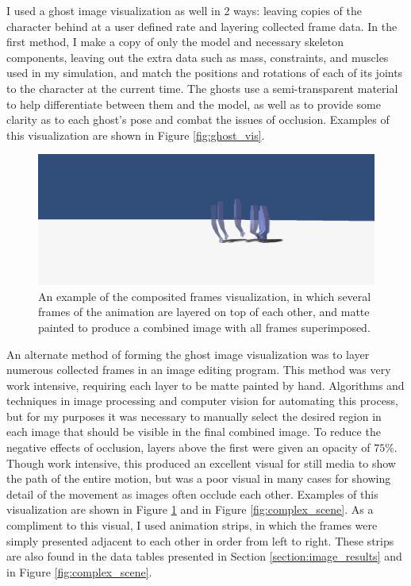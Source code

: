 I used a ghost image visualization as well in 2 ways: leaving copies of the character behind at a user defined rate and layering collected frame data.  In the first method, I make a copy of only the model and necessary skeleton components, leaving out the extra data such as mass, constraints, and muscles used in my simulation, and match the positions and rotations of each of its joints to the character at the current time.  The ghosts use a semi-transparent material to help differentiate between them and the model, as well as to provide some clarity as to each ghost's pose and combat the issues of occlusion.  Examples of this visualization are shown in Figure \ref{fig:ghost_vis}.

\begin{figure}[ht]
	\centering
	\includegraphics[width=\textwidth]{images/k200kvaryingcomposite.png}
	\caption[Composite frame visualization]{An example of the composited frames visualization, in which several frames of the animation are layered on top of each other, and matte painted to produce a combined image with all frames superimposed.}
	\label{fig:composite_vis}
\end{figure}

An alternate method of forming the ghost image visualization was to layer numerous collected frames in an image editing program.  This method was very work intensive, requiring each layer to be matte painted by hand.  Algorithms and techniques in image processing and computer vision for automating this process, but for my purposes it was necessary to manually select the desired region in each image that should be visible in the final combined image.  To reduce the negative effects of occlusion, layers above the first were given an opacity of $75\%$.  Though work intensive, this produced an excellent visual for still media to show the path of the entire motion, but was a poor visual in many cases for showing detail of the movement as images often occlude each other.  Examples of this visualization are shown in Figure \ref{fig:composite_vis} and in Figure \ref{fig:complex_scene}.  As a compliment to this visual, I used animation strips, in which the frames were simply presented adjacent to each other in order from left to right.  These strips are also found in the data tables presented in Section \ref{section:image_results} and in Figure \ref{fig:complex_scene}.

